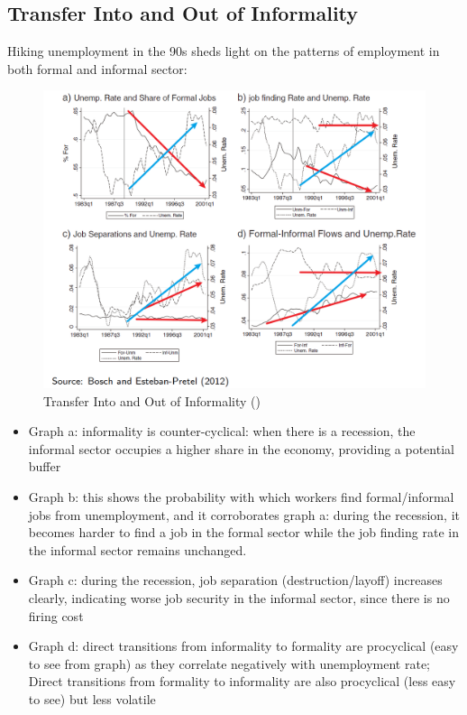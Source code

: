             \subsection{Transfer Into and Out of Informality}
                Hiking unemployment in the 90s sheds light on the patterns of employment in both formal and informal sector:
                \begin{figure}[H]
                    \centering
                    \includegraphics[width=5.5in]{images/ch5/ins and outs of informality.png}
                    \caption{Transfer Into and Out of Informality (\cite{bosch_job_2012})}
                \end{figure}
                \begin{itemize}
                    \item Graph a: informality is counter-cyclical: when there is a recession, the informal sector occupies a higher share in the economy, providing a potential buffer
                    \item Graph b: this shows the probability with which workers find formal/informal jobs from unemployment, and it corroborates graph a: during the recession, it becomes harder to find a job in the formal sector while the job finding rate in the informal sector remains unchanged.
                    \item Graph c: during the recession, job separation (destruction/layoff) increases clearly, indicating worse job security in the informal sector, since there is no firing cost
                    \item Graph d: direct transitions from informality to formality are procyclical (easy to see from graph) as they correlate negatively with unemployment rate; Direct transitions from formality to informality are also procyclical (less easy to see) but less volatile
                \end{itemize}
            
